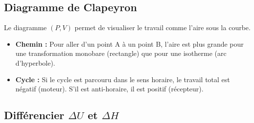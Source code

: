 \documentclass[french]{yLectureNote}
\begin{document}
\subsection{Diagramme de Clapeyron}
Le diagramme $(P, V)$ permet de visualiser le travail comme l'aire sous la courbe.
\begin{itemize}
    \item \textbf{Chemin :} Pour aller d'un point A à un point B, l'aire est plus grande pour une transformation monobare (rectangle) que pour une isotherme (arc d'hyperbole).
    \item \textbf{Cycle :} Si le cycle est parcouru dans le sens horaire, le travail total est négatif (moteur). S'il est anti-horaire, il est positif (récepteur).
\end{itemize}

\subsection{Différencier $\Delta U$ et $\Delta H$}
\end{document}
